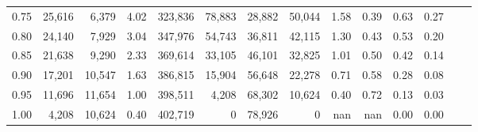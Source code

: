 \begin{tabular}{rrrrrrrrrrrrrr}
0.75 &  25,616 &   6,379 &    4.02 &  323,836 &   78,883 &  28,882 &  50,044 &  1.58 &  0.39 &  0.63 &      0.27 \\
0.80 &  24,140 &   7,929 &    3.04 &  347,976 &   54,743 &  36,811 &  42,115 &  1.30 &  0.43 &  0.53 &      0.20 \\
0.85 &  21,638 &   9,290 &    2.33 &  369,614 &   33,105 &  46,101 &  32,825 &  1.01 &  0.50 &  0.42 &      0.14 \\
0.90 &  17,201 &  10,547 &    1.63 &  386,815 &   15,904 &  56,648 &  22,278 &  0.71 &  0.58 &  0.28 &      0.08 \\
0.95 &  11,696 &  11,654 &    1.00 &  398,511 &    4,208 &  68,302 &  10,624 &  0.40 &  0.72 &  0.13 &      0.03 \\
1.00 &   4,208 &  10,624 &    0.40 &  402,719 &        0 &  78,926 &       0 &   nan &   nan &  0.00 &      0.00 \\
\bottomrule
\end{tabular}
